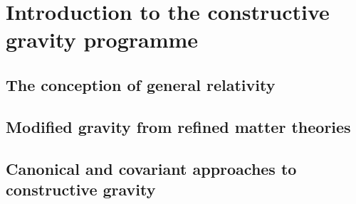 \chapter{Introduction to the constructive gravity programme}

\section{The conception of general relativity}

\section{Modified gravity from refined matter theories}

\section{Canonical and covariant approaches to constructive gravity}
